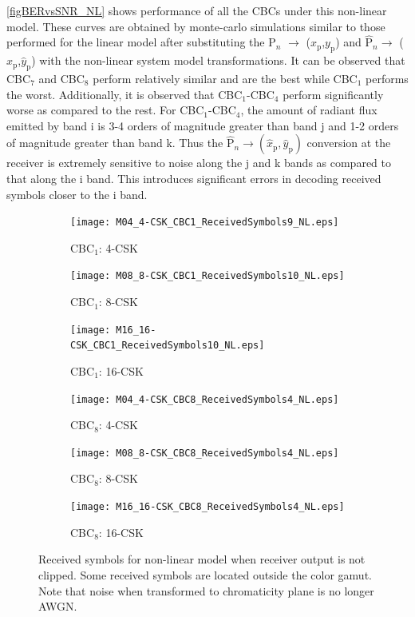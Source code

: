 \documentclass[10pt,letterpaper]{article}
\begin{document}

\figurename\ref{figBERvsSNR_NL} shows performance of all the CBCs under this non-linear model. These curves are obtained by monte-carlo simulations similar to those performed for the linear model after substituting the P$_{n}$ $\rightarrow$ ($x_{\text{p}}$,$y_{\text{p}}$) and $\hat{\text{P}}_{n}\rightarrow$ ($\hat{x}_{\text{p}}$,$\hat{y}_{\text{p}}$) with the non-linear system model transformations. It can be observed that CBC$_{7}$ and CBC$_{8}$ perform relatively similar and are the best while CBC$_{1}$ performs the worst. Additionally, it is observed that CBC$_{1}$-CBC$_{4}$ perform significantly worse as compared to the rest. For CBC$_{1}$-CBC$_{4}$, the amount of radiant flux emitted by band i is 3-4 orders of magnitude greater than band j and 1-2 orders of magnitude greater than band k. Thus the $\hat{\text{P}}_{n}\rightarrow (\hat{x}_{\text{p}},\hat{y}_{\text{p}})$ conversion at the receiver is extremely sensitive to noise along the j and k bands as compared to that along the i band. This introduces significant errors in decoding received symbols closer to the i band.

\begin{figure}[t]
	\centering
		\begin{subfigure}{0.32\textwidth}
		\centering
			\texttt{[image: M04\_4-CSK\_CBC1\_ReceivedSymbols9\_NL.eps]}
			\caption{CBC$_{1}$: 4-CSK}
			\label{fig4RcvSym_NL1}
		\end{subfigure}
		\hfill
		\begin{subfigure}{0.32\textwidth}
		\centering
			\texttt{[image: M08\_8-CSK\_CBC1\_ReceivedSymbols10\_NL.eps]}
			\caption{CBC$_{1}$: 8-CSK}
			\label{fig8RcvSym_NL1}
		\end{subfigure}
		\hfill
		\begin{subfigure}{0.32\textwidth}
		\centering
			\texttt{[image: M16\_16-CSK\_CBC1\_ReceivedSymbols10\_NL.eps]}
			\caption{CBC$_{1}$: 16-CSK}
			\label{fig16RcvSym_NL1}
		\end{subfigure}
		\vfill
		\begin{subfigure}{0.32\textwidth}
		\centering
			\texttt{[image: M04\_4-CSK\_CBC8\_ReceivedSymbols4\_NL.eps]}
			\caption{CBC$_{8}$: 4-CSK}
			\label{fig4RcvSym_NL8}
		\end{subfigure}
		\hfill
		\begin{subfigure}{0.32\textwidth}
		\centering
			\texttt{[image: M08\_8-CSK\_CBC8\_ReceivedSymbols4\_NL.eps]}
			\caption{CBC$_{8}$: 8-CSK}
			\label{fig8RcvSym_NL8}
		\end{subfigure}
		\hfill
		\begin{subfigure}{0.32\textwidth}
		\centering
			\texttt{[image: M16\_16-CSK\_CBC8\_ReceivedSymbols4\_NL.eps]}
			\caption{CBC$_{8}$: 16-CSK}
			\label{fig16RcvSym_NL8}
		\end{subfigure}
	\caption{Received symbols for non-linear model when receiver output is not clipped. Some received symbols are located outside the color gamut. Note that noise when transformed to chromaticity plane is no longer AWGN.}
	\label{figRcvSym_NL}
\end{figure}
\end{document}
